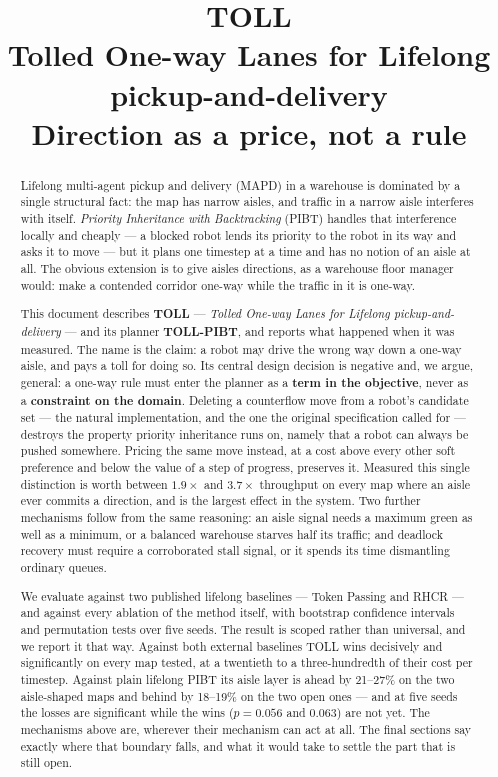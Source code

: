 \documentclass[11pt,a4paper]{article}
\title{\textbf{TOLL}\\[0.2em]
  \large \textnormal{\textbf{T}olled \textbf{O}ne-way \textbf{L}anes for
  \textbf{L}ifelong pickup-and-delivery}\\[0.55em]
  \large Direction as a price, not a rule}
\author{}
\date{}
\begin{document}
\maketitle
\thispagestyle{empty}

\begin{abstract}
\noindent
Lifelong multi-agent pickup and delivery (MAPD) in a warehouse is dominated by
a single structural fact: the map has narrow aisles, and traffic in a narrow
aisle interferes with itself. \emph{Priority Inheritance with Backtracking}
(PIBT) handles that interference locally and cheaply --- a blocked robot lends
its priority to the robot in its way and asks it to move --- but it plans one
timestep at a time and has no notion of an aisle at all. The obvious extension
is to give aisles directions, as a warehouse floor manager would: make a
contended corridor one-way while the traffic in it is one-way.

This document describes \textbf{TOLL} --- \emph{Tolled One-way Lanes for
Lifelong pickup-and-delivery} --- and its planner \textbf{TOLL-PIBT}, and
reports what happened when it was measured. The name is the claim: a robot may
drive the wrong way down a one-way aisle, and pays a toll for doing so. Its central design decision is negative and, we
argue, general: a one-way rule must enter the planner as a \textbf{term in the
objective}, never as a \textbf{constraint on the domain}. Deleting a
counterflow move from a robot's candidate set --- the natural implementation,
and the one the original specification called for --- destroys the property
priority inheritance runs on, namely that a robot can always be pushed
somewhere. Pricing the same move instead, at a cost above every other soft
preference and below the value of a step of progress, preserves it. Measured
this single distinction is worth between $1.9\times$ and $3.7\times$
throughput on every map where an aisle ever commits a direction, and is the
largest effect in the system. Two further
mechanisms follow from the same reasoning: an aisle signal needs a maximum
green as well as a minimum, or a balanced warehouse starves half its traffic;
and deadlock recovery must require a corroborated stall signal, or it spends
its time dismantling ordinary queues.

We evaluate against two published lifelong baselines --- Token Passing and
RHCR --- and against every ablation of the method itself, with bootstrap
confidence intervals and permutation tests over five seeds. The result is
scoped rather than universal, and we report it that way. Against both external
baselines TOLL wins decisively and significantly on every map tested, at a
twentieth to a three-hundredth of their cost per timestep. Against plain
lifelong PIBT its aisle layer is ahead by 21--27\% on the two aisle-shaped maps
and behind by 18--19\% on the two open ones --- and at five seeds the losses
are significant while the wins ($p = 0.056$ and $0.063$) are not yet. The
mechanisms above are, wherever their mechanism can act at all. The final
sections say exactly where that boundary falls, and what it would take to
settle the part that is still open.
\end{abstract}
\end{document}
